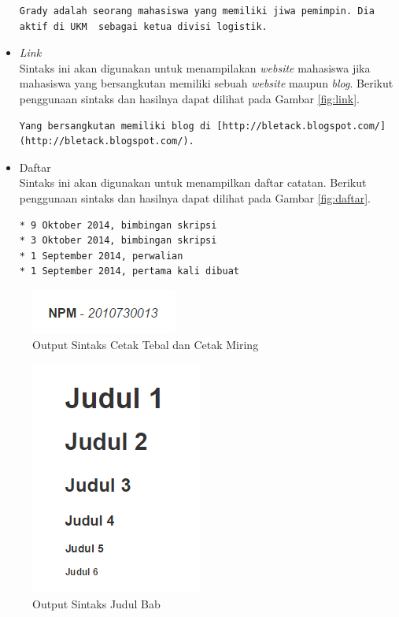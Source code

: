 \begin{itemize}
\begin{lstlisting}[basicstyle=\footnotesize]
Grady adalah seorang mahasiswa yang memiliki jiwa pemimpin. Dia aktif di UKM  sebagai ketua divisi logistik.
\end{lstlisting}
\item {\it Link}\\
Sintaks ini akan digunakan untuk menampilakan {\it website} mahasiswa jika
mahasiswa yang bersangkutan memiliki sebuah {\it website} maupun {\it blog}.
Berikut penggunaan sintaks dan hasilnya dapat dilihat pada Gambar \ref{fig:link}.
\begin{lstlisting}[basicstyle=\footnotesize]
Yang bersangkutan memiliki blog di [http://bletack.blogspot.com/](http://bletack.blogspot.com/).
\end{lstlisting}
\item Daftar\\
Sintaks ini akan digunakan untuk menampilkan daftar catatan. Berikut penggunaan
sintaks dan hasilnya dapat dilihat pada Gambar \ref{fig:daftar}.
\begin{lstlisting}[basicstyle=\footnotesize]
* 9 Oktober 2014, bimbingan skripsi
* 3 Oktober 2014, bimbingan skripsi
* 1 September 2014, perwalian
* 1 September 2014, pertama kali dibuat
\end{lstlisting}
\end{itemize}

\begin{figure}[p]
\centering
\includegraphics[scale=1]{Gambar/cetaktebal.png}
\caption[Output Sintaks Cetak Tebal dan Cetak Miring]{Output Sintaks Cetak Tebal
dan Cetak Miring}
\label{fig:cetaktebal}
\end{figure}

\begin{figure}[p]
\centering
\includegraphics[scale=1]{Gambar/judul.png}
\caption[Output Sintaks Judul Bab]{Output Sintaks Judul Bab} 
\label{fig:judul}
\end{figure}


